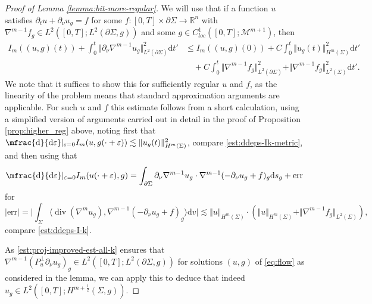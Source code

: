 \documentclass[10pt,reqno]{amsart}
\theoremstyle{plain}
\theoremstyle{definition}
\newcommand{\pnu}{\partial_\nu}
\numberwithin{equation}{section}
\newcommand{\Si}{\Sigma}
\newcommand{\R}{\ensuremath{{\mathbb R}}}
\newcommand{\norm}[1]{\Vert#1\Vert}
\DeclareMathOperator{\Div}{div}
\newcommand{\beqas}{\begin{equation*}\begin{aligned}}
\newcommand{\eeqas}{\end{aligned}\end{equation*}}
\newcommand{\half}{\frac{1}{2}}
\newcommand{\dd}{\mathrm{d}} %
\newcommand{\leqs}{\lesssim}
\newcommand{\pt}{\partial_t}
\newcommand{\abs}[1]{\vert#1\vert}
\newcommand{\eps}{\varepsilon}
\newcommand{\na}{\nabla}
\newcommand{\pSi}{{\partial \Sigma}}
\newcommand{\MM}{\mathcal{M}} %
\newcommand{\p}{\partial} %
\newcommand{\inner}[2]{\langle #1, #2\rangle} %
\newcommand{\err}{\text{err}}
\begin{document}
 
\begin{proof}[Proof of Lemma \ref{lemma:bit-more-regular}]
    We will use that if a function $u$ satisfies $\pt u+\pnu u_g=f$ for some $f:[0,T]\times \pSi\to \R^n$ with $\na^{m-1} f_g\in L^2([0,T];L^{2}(\pSi,g))$ and some 
   $g\in C^1_{loc}([0,T];\MM^{m+1})$, then 
    \beqas
        I_m((u,g)(t))
        +\int_0^t\norm{\pnu \na^{m-1} u_g}_{L^2(\pSi)}^2\dd t' &\leq 
            I_m((u,g)(0)) +C\int_0^t \norm{u_g(t)}_{H^m(\Si)}^2 \dd t'\\
        & \quad + C \int_0^t \norm{\na^{m-1}f_g}_{L^{2}(\pSi)}^2+ \norm{\na^{m-1}f_g}_{L^{2}(\Si)}^2\dd t'.
    \eeqas
    We note that it suffices to show this for sufficiently regular $u$ and $f$, as the linearity of the problem means that standard approximation arguments are applicable. For such $u$ and $f$ this estimate follows from a short calculation,  using a simplified version of arguments carried out in detail in the proof of Proposition \ref{prop:higher_reg} above,  noting first that $\mfrac{\dd}{\dd \eps}\vert_{\eps=0}I_m(u,g(\cdot+\eps))\leqs \norm{u_g(t)}_{H^m(\Si)}^2$, compare  \eqref{est:ddeps-Ik-metric}, and then using that
   $$\mfrac{\dd}{\dd \eps}\vert_{\eps=0}I_m(u(\cdot+\eps),g) =\int_\pSi \pnu \na^{m-1} u_g\cdot\na^{m-1}  (-\pnu u_g+f)_g \dd s_g +\err$$ for $$\abs{\err}=\abs{\int_\Si \inner{\Div(\na^{m} u_g)}{\na^{m-1}(-\p_\nu u_g+f)_g}\dd v}\leqs \norm{u}_{H^m(\Si)}\cdot (\norm{u}_{H^m(\Si)}+\norm{\na^{m-1}f_g}_{L^2(\Si)} ),$$ compare \eqref{est:ddeps-I-k}.
   
  
    As \eqref{est:proj-improved-est-all-k} ensures that $\na^{m-1}(P_u^\perp\pnu u_g)_g\in L^2([0,T];L^2(\pSi,g)) $ for solutions $(u,g)$ of \eqref{eq:flow} as considered in the lemma, we can apply this to deduce that indeed
$u_g\in L^2([0,T];H^{m+\half}(\Si,g))$.
\end{proof}
\end{document}

